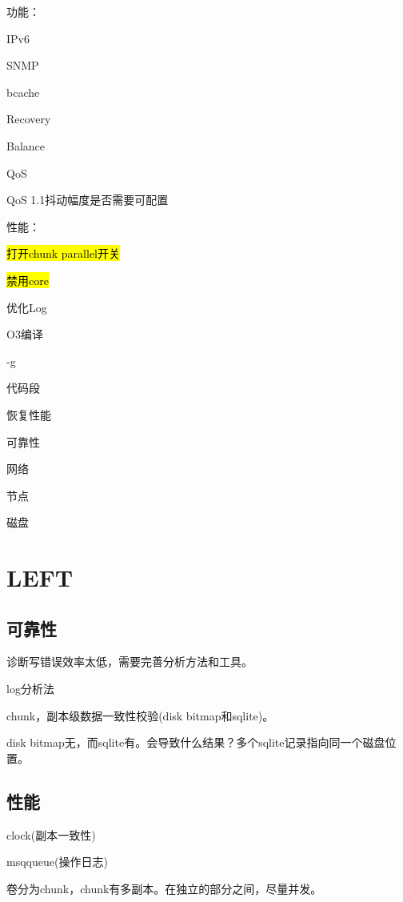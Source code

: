 功能：
\begin{enumbox}
\item IPv6
\item SNMP
\item bcache
\item Recovery
\item Balance
\item QoS
\item QoS 1.1抖动幅度是否需要可配置
\end{enumbox}

性能：
\begin{enumbox}
\item \hl{打开chunk parallel开关}
\item \hl{禁用core}
\item 优化Log
\item O3编译
\item -g
\item 代码段
\item 恢复性能
\end{enumbox}

可靠性
\begin{enumbox}
\item 网络
\item 节点
\item 磁盘
\end{enumbox}

\section{LEFT}

\subsection{可靠性}

诊断写错误效率太低，需要完善分析方法和工具。

log分析法

chunk，副本级数据一致性校验(disk bitmap和sqlite)。

disk bitmap无，而sqlite有。会导致什么结果？多个sqlite记录指向同一个磁盘位置。

\subsection{性能}

clock(副本一致性)

msqqueue(操作日志)

卷分为chunk，chunk有多副本。在独立的部分之间，尽量并发。

